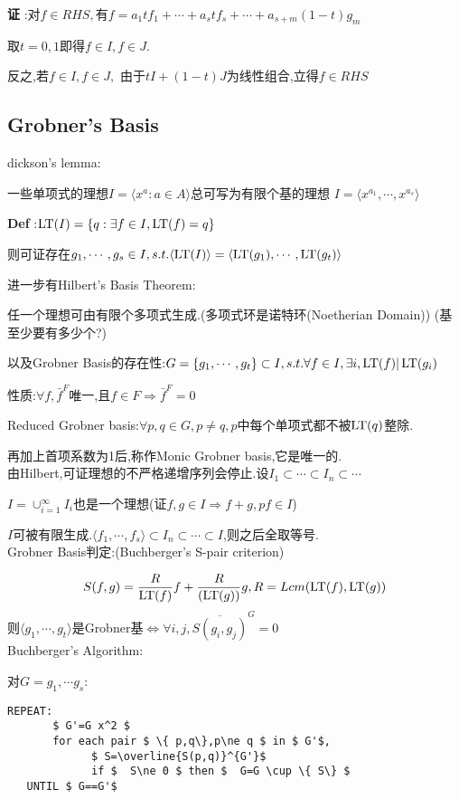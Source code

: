 {\bf 证 }:对$ f\in RHS,$有$ f=a_1tf_1+\cdots+a_stf_s+\cdots+a_{s+m}(1-t)g_m$

取$ t=0,1$即得$ f\in I,f\in J$.

反之,若$ f\in I,f\in J,$ 由于$ tI+(1-t)J$为线性组合,立得$ f\in RHS$

\subsection{Grobner's Basis}
dickson's lemma:

一些单项式的理想$ I= \langle x^a : a\in A \rangle $总可写为有限个基的理想
$ I= \langle x^{a_1},\cdots,x^{a_s} \rangle $

{\bf Def }:$ \operatorname{\tiny{LT}}(I)=\{q: \exists f \in I,\operatorname{\tiny{LT}}(f)=q\}$

则可证存在$ g_1,\cdots,g_s\in I,s.t.  \langle \operatorname{\tiny{LT}}(I) \rangle = \langle \operatorname{\tiny{LT}}(g_1),\cdots,\operatorname{\tiny{LT}}(g_t) \rangle $

进一步有Hilbert's Basis Theorem:

任一个理想可由有限个多项式生成.(多项式环是诺特环(Noetherian Domain))   (基至少要有多少个?)

以及Grobner Basis的存在性:$ G=\{g_1,\cdots,g_t\}\subset I,s.t.\forall f\in I,\exists i, \operatorname{\tiny{LT}}(f)|\operatorname{\tiny{LT}}(g_i)$

性质:$ \forall f,\bar{f}^F$唯一,且$ f\in F\Rightarrow \bar{f}^F=0$

Reduced Grobner basis:$ \forall p,q\in G,p\ne q,p$中每个单项式都不被$ \operatorname{\tiny{LT}}(q)$整除.

再加上首项系数为1后,称作Monic Grobner basis,它是唯一的.
\\

由Hilbert,可证理想的不严格递增序列会停止.设$ I_1\subset\cdots\subset I_n\subset\cdots$

$ I=\cup_{i=1}^{\infty}I_i$也是一个理想(证$ f,g\in I \Rightarrow f+g,pf\in I$)

$ I$可被有限生成.$  \langle f_1,\cdots,f_s \rangle \subset I_n\subset\cdots \subset I$,则之后全取等号.
\\

Grobner Basis判定:(Buchberger's S-pair criterion)

\[  S(f,g)=\dfrac{R}{\operatorname{\tiny{LT}}(f)}f+\dfrac{R}{(\operatorname{\tiny{LT}}(g))}g,R=Lcm(\operatorname{\tiny{LT}} (f),\operatorname{\tiny{LT}} (g))\]
则$  \langle g_1,\cdots,g_t \rangle $是Grobner基$ \Leftrightarrow \forall i,j,\overline{S(g_i,g_j)}^G=0$
\\

Buchberger's Algorithm:

对$ G={g_1,\cdots g_s}$:

\begin{lstlisting}[mathescape]
   REPEAT:
       $ G'=G x^2 $
       for each pair $ \{ p,q\},p\ne q $ in $ G'$,
             $ S=\overline{S(p,q)}^{G'}$
             if $  S\ne 0 $ then $  G=G \cup \{ S\} $
   UNTIL $ G==G'$
\end{lstlisting}


